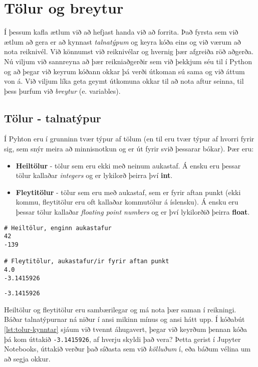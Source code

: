 
\chapter{Tölur og breytur}\label{k:tolur}
Í þessum kafla ætlum við að hefjast handa við að forrita. 
Það fyrsta sem við ætlum að gera er að kynnast \emph{talnatýpum} og keyra kóða eins og við værum að nota reiknivél. 
Við könnumst við reiknivélar og hvernig þær afgreiða röð aðgerða. 
Nú viljum við sannreyna að þær reikniaðgerðir sem við þekkjum séu til í Python og að þegar við keyrum kóðann okkar þá verði útkoman sú sama og við áttum von á. 
Við viljum líka geta geymt útkomuna okkar til að nota aftur seinna, til þess þurfum við \emph{breytur} (e. variables).

\section{Tölur - talnatýpur}
Í Pyhton eru í grunninn tvær týpur af tölum (en til eru tvær týpur af hvorri fyrir sig, sem snýr meira að minnisnotkun og er út fyrir svið þessarar bókar). 
Þær eru:

\begin{itemize}
	\item \textbf{Heiltölur} - tölur sem eru ekki með neinum aukastaf. 
	Á ensku eru þessar tölur kallaðar \textit{integers} og er lykilorð þeirra því \textbf{int}.
	\item \textbf{Fleytitölur} - tölur sem eru með aukastaf, sem er fyrir aftan punkt (ekki kommu, fleytitölur eru oft kallaðar kommutölur á íslensku). 
	Á ensku eru þessar tölur kallaðar \textit{floating point numbers} og er því lykilorðið þeirra \textbf{float}.
\end{itemize}

\begin{lstlisting}[caption=Heiltölur og fleytitölur, label=lst:tolur-kynntar]
# Heiltölur, enginn aukastafur
42
-139

# Fleytitölur, aukastafur/ir fyrir aftan punkt
4.0
-3.1415926
\end{lstlisting}
\lstset{style=uttak}
\begin{lstlisting}
-3.1415926
\end{lstlisting}
\lstset{style=venjulegt}

Heiltölur og fleytitölur eru sambærilegar og má nota þær saman í reikningi.
Báðar talnatýpurnar ná niður í ansi mikinn mínus og ansi hátt upp.
Í kóðabút \ref{lst:tolur-kynntar} sjáum við tvennt áhugavert, þegar við keyrðum þennan kóða þá kom úttakið \texttt{-3.1415926}, af hverju skyldi það vera?
Þetta gerist í Jupyter Notebooks, úttakið verður það síðasta sem við \emph{kölluðum} í, eða báðum vélina um að segja okkur.

